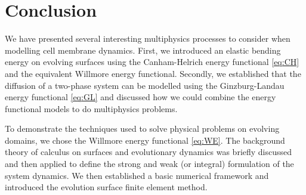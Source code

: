 \section{Conclusion}

We have presented several interesting multiphysics processes to consider when modelling cell membrane dynamics. First, we introduced an elastic bending energy on evolving surfaces using the Canham-Helrich energy functional \eqref{eq:CH} and the equivalent Willmore energy functional. Secondly, we established that the diffusion of a two-phase system can be modelled using the Ginzburg-Landau energy functional \eqref{eq:GL} and discussed how we could combine the energy functional models to do multiphysics problems. 

To demonstrate the techniques used to solve physical problems on evolving domains, we chose the Willmore energy functional \eqref{eq:WE}. The background theory of calculus on surfaces and evolutionary dynamics was briefly discussed and then applied to define the strong and weak (or integral) formulation of the system dynamics. We then established a basic numerical framework and introduced the evolution surface finite element method.
